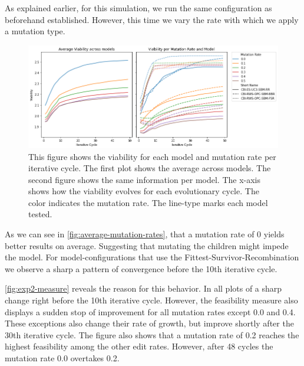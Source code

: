 \documentclass[./../../paper.tex]{subfiles}
\begin{document}
As explained earlier, for this simulation, we run the same configuration as beforehand established. However, this time we vary the rate with which we apply a mutation type. 

\begin{figure}[htbp]
    \centering
    \includegraphics[width=\textwidth]{figures/generated/exp2_viability_by_mrate_model.png}
    \caption{This figure shows the viability for each model and mutation rate per iterative cycle. The first plot shows the average across models. The second figure shows the same information per model. The x-axis shows how the viability evolves for each evolutionary cycle. The color indicates the mutation rate. The line-type marks each model tested.}
    \label{fig:average-mutation-rates}
\end{figure}


\noindent As we can see in \autoref{fig:average-mutation-rates}, that a mutation rate of 0 yields better results on average. Suggesting that mutating the children might impede the model. 
For model-configurations that use the Fittest-Survivor-Recombination we observe a sharp a pattern of convergence before the 10th iterative cycle.  



\autoref{fig:exp2-measure} reveals the reason for this behavior.
In all plots of a sharp change right before the 10th iterative cycle. However, the feasibility measure also displays a sudden stop of improvement for all mutation rates except 0.0 and 0.4. These exceptions also change their rate of growth, but improve shortly after the 30th iterative cycle.  The figure also shows that a mutation rate of 0.2 reaches the highest feasibility among the other edit rates. However, after 48 cycles the mutation rate 0.0 overtakes 0.2.     
\end{document}
